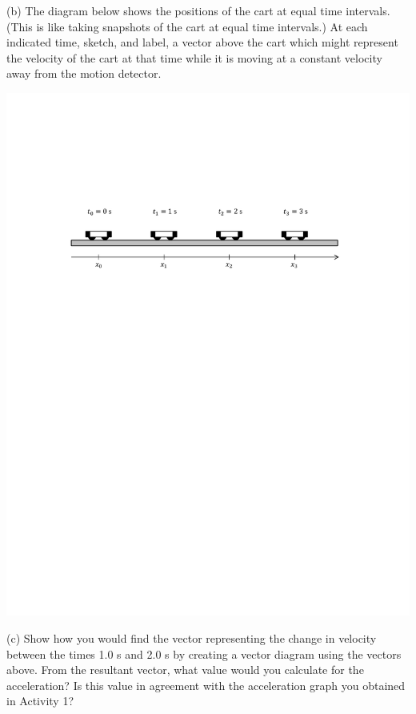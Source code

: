 (b) The diagram below shows the positions of the cart at equal time intervals.
(This is like taking snapshots of the cart at equal time intervals.) At each
indicated time, sketch, and label, a vector above the cart which might represent the velocity
of the cart at that time while it is moving at a constant velocity away from
the motion detector.

{\par\centering \includegraphics{changing/carts_const_v.pdf} \par}

(c) Show how you would find the vector representing the change in velocity
between the times 1.0 s and 2.0 s by creating a vector diagram using the 
vectors above. From the resultant vector, what value would you calculate for 
the acceleration? Is this value in agreement
with the acceleration graph you obtained in Activity 1?
\answerspace{20mm}

